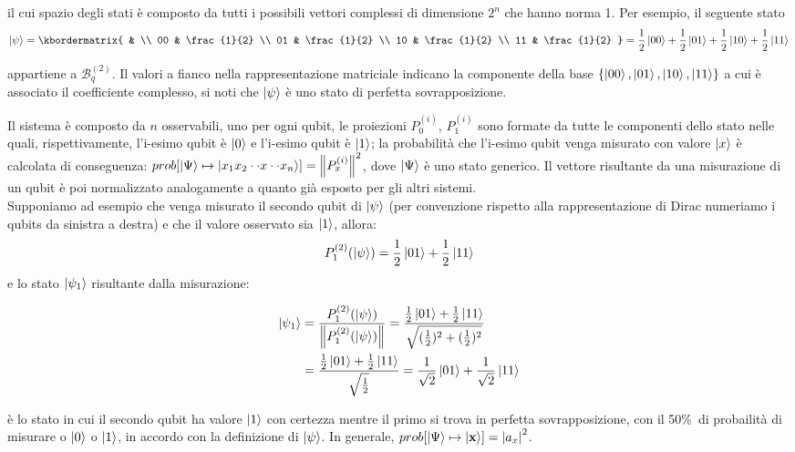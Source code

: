 \documentclass[12pt,a4paper,openright]{report}
\newcommand{\norm}[1]{\left\lVert#1\right\rVert}
\begin{document}
il cui spazio degli stati è composto da tutti i possibili vettori complessi di dimensione $2^n$ che hanno norma 1. Per esempio, il seguente stato  
\[
    \ket{\psi} = 
         \kbordermatrix{
              &    \\
          00 & \frac{1}{2} \\
          01 & \frac{1}{2} \\
          10 & \frac{1}{2} \\
          11 & \frac{1}{2}   
            } = \frac{1}{2}\ket{00} + \frac{1}{2}\ket{01} + \frac{1}{2}\ket{10} + \frac{1}{2}\ket{11}
\] 

appartiene a $\mathcal{B}_q^{(2)}$. Il valori a fianco nella rappresentazione matriciale indicano la componente della base $\{ \ket{00}, \ket{01}, \ket{10}, \ket{11} \}$ a cui è associato il coefficiente complesso,
si noti che $\ket{\psi}$ è uno stato di perfetta sovrapposizione.\par
Il sistema è composto da $n$ osservabili, uno per ogni qubit, le proiezioni ${P^{(i)}_0}$, ${P^{(i)}_1}$ sono formate da tutte le componenti dello stato nelle quali, rispettivamente, l'i-esimo qubit è $\ket0$
e l'i-esimo qubit è $\ket1$; la probabilità che l'i-esimo qubit venga misurato con valore $\ket{x}$ è calcolata di conseguenza:
$prob[\ket{\Psi} \mapsto \ket{x_1 x_2 \cdot \cdot x \cdot \cdot x_n}]= \norm{{P^{(i)}_x}}^2$, dove $\ket{\Psi}$ è uno stato generico. Il vettore risultante da una misurazione di un qubit è poi normalizzato analogamente a quanto già esposto per gli altri sistemi.\\
Supponiamo ad esempio che venga misurato il secondo qubit di $\ket{\psi}$ (per convenzione rispetto alla rappresentazione di Dirac numeriamo i qubits da sinistra a destra) e che il valore osservato sia $\ket1$, allora:
\[
    {P^{(2)}_1}(\ket{\psi}) = \frac{1}{2}\ket{01} + \frac{1}{2}\ket{11}  
\]
e lo stato $\ket{\psi_1}$ risultante dalla misurazione:
\begin{center}
    \begin{align*}
        \ket{\psi_1} &= \frac{{P^{(2)}_1}(\ket{\psi}) }{ \norm{{P^{(2)}_1}(\ket{\psi})} } = \frac{\frac{1}{2}\ket{01} + \frac{1}{2}\ket{11}}{\sqrt{(\frac{1}{2})^2 + (\frac{1}{2})^2}}\\
        &= \frac{\frac{1}{2}\ket{01} + \frac{1}{2}\ket{11}}{\sqrt{\frac{1}{2}}} = \frac{1}{\sqrt2}\ket{01} + \frac{1}{\sqrt2}\ket{11}
    \end{align*}
\end{center}
è lo stato in cui il secondo qubit ha valore $\ket1$ con certezza mentre il primo si trova in perfetta sovrapposizione, con il 50\%\ di probailità di misurare o $\ket0$ o $\ket1$, in accordo con la definizione
di $\ket{\psi}$. In generale, $prob[\ket{\Psi} \mapsto \ket{\textbf{x}}] ={\left\vert{a_x}\right\vert}^2$.\par
\end{document}
